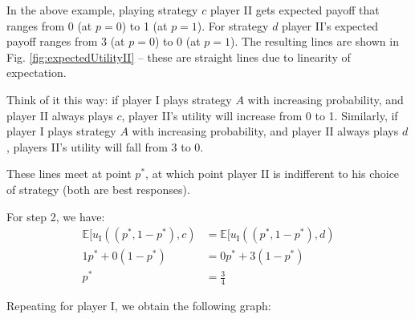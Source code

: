 	In the above example, playing strategy $c$ player II gets expected
	payoff that ranges from 0 (at $p=0$) to 1 (at $p=1$). For strategy $d$
	player II's expected payoff ranges from 3 (at $p=0$) to 0 (at $p=1$).
	The resulting lines are shown in Fig. \ref{fig:expectedUtilityII} --
	these are straight lines due to linearity of expectation.
	\begin{center}
	\end{center}

	Think of it this way: if player I plays strategy $A$ with increasing
	probability, and player II always plays $c$, player II's utility will
	increase from 0 to 1. Similarly, if player I plays strategy $A$ with
	increasing probability, and player II always plays $d$, players II's
	utility will fall from 3 to 0.

	These lines meet at point $p^*$, at which point player II is
	indifferent to his choice of strategy (both are best responses).

	For step 2, we have:
	\begin{equation*}
		\begin{split}
			\mathbb{E}[u_\text{I}((p^*, 1-p^*), c) & =
			\mathbb{E}[u_\text{I}((p^*, 1-p^*), d) \\
			1 p^* + 0 (1 - p^*) & = 0 p^* + 3 (1-p^*) \\
			p^* & = \frac{3}{4}
		\end{split}
	\end{equation*}

	Repeating for player I, we obtain the following graph:
	\begin{center}
	\end{center}

